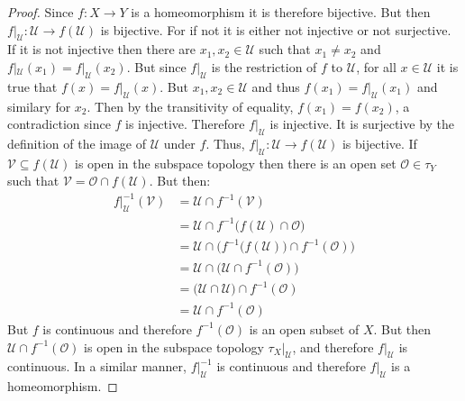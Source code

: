\documentclass[oneside]{book}                                                  %
\begin{document}
            \begin{proof}
                Since $f:X\rightarrow{Y}$ is a homeomorphism it is therefore
                bijective. But then
                $f|_{\mathcal{U}}:\mathcal{U}\rightarrow{f}(\mathcal{U})$ is
                bijective. For if not it is either not injective or not
                surjective. If it is not injective then there are
                $x_{1},x_{2}\in\mathcal{U}$ such that $x_{1}\ne{x}_{2}$ and
                $f|_{\mathcal{U}}(x_{1})=f|_{\mathcal{U}}(x_{2})$. But since
                $f|_{\mathcal{U}}$ is the restriction of $f$ to $\mathcal{U}$,
                for all $x\in\mathcal{U}$ it is true that
                $f(x)=f|_{\mathcal{U}}(x)$. But $x_{1},x_{2}\in\mathcal{U}$ and
                thus $f(x_{1})=f|_{\mathcal{U}}(x_{1})$ and similary for
                $x_{2}$. Then by the transitivity of equality,
                $f(x_{1})=f(x_{2})$, a contradiction since $f$ is injective.
                Therefore $f|_{\mathcal{U}}$ is injective. It is surjective by
                the definition of the image of $\mathcal{U}$ under $f$. Thus,
                $f|_{\mathcal{U}}:\mathcal{U}\rightarrow{f}(\mathcal{U})$ is
                bijective. If $\mathcal{V}\subseteq{f}(\mathcal{U})$ is open in
                the subspace topology then there is an open set
                $\mathcal{O}\in\tau_{Y}$ such that
                $\mathcal{V}=\mathcal{O}\cap{f}(\mathcal{U})$. But then:
                \begin{subequations}
                    \begin{align}
                        f|_{\mathcal{U}}^{\minus{1}}(\mathcal{V})
                        &=\mathcal{U}\cap{f}^{\minus{1}}(\mathcal{V})\\
                        &=\mathcal{U}\cap
                            f^{\minus{1}}\big(
                                f(\mathcal{U})\cap\mathcal{O}
                            \big)\\
                        &=\mathcal{U}\cap\Big(
                            f^{\minus{1}}\big(f(\mathcal{U})\big)\cap
                            f^{\minus{1}}(\mathcal{O})
                        \Big)\\
                        &=\mathcal{U}\cap\big(
                            \mathcal{U}\cap{f}^{\minus{1}}(\mathcal{O})\big)\\
                        &=\big(\mathcal{U}\cap\mathcal{U})\cap
                            f^{\minus{1}}(\mathcal{O})\\
                        &=\mathcal{U}\cap{f}^{\minus{1}}(\mathcal{O})
                    \end{align}
                \end{subequations}
                But $f$ is continuous and therefore $f^{\minus{1}}(\mathcal{O})$
                is an open subset of $X$. But then
                $\mathcal{U}\cap{f}^{\minus{1}}(\mathcal{O})$ is open in the
                subspace topology $\tau_{X}|_{\mathcal{U}}$, and therefore
                $f|_{\mathcal{U}}$ is continuous. In a similar manner,
                $f|_{\mathcal{U}}^{\minus{1}}$ is continuous and therefore
                $f|_{\mathcal{U}}$ is a homeomorphism.
            \end{proof}
\end{document}
